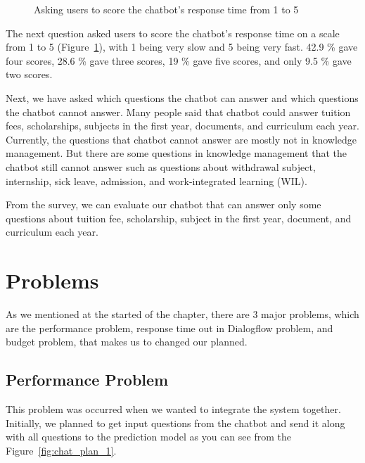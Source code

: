 \documentclass[12pt,oneside,openright,a4paper]{cpe-english-project}
\begin{document}
\begin{figure}[!h]\centering
	\caption{Asking users to score the chatbot's response time from 1 to 5}
	\label{fig:chatbot_speed}
\end{figure}

The next question asked users to score the chatbot's response time on a scale from 1 to 5 (Figure~\ref*{fig:chatbot_speed}), with 1 being very slow and 5 being very fast. 42.9 \% gave four scores, 28.6 \% gave three scores, 19 \% gave five scores, and only 9.5 \% gave two scores.

Next, we have asked which questions the chatbot can answer and which questions the chatbot cannot answer. Many people said that chatbot could answer tuition fees, scholarships, subjects in the first year, documents, and curriculum each year. Currently, the questions that chatbot cannot answer are mostly not in knowledge management. But there are some questions in knowledge management that the chatbot still cannot answer such as questions about withdrawal subject, internship, sick leave, admission, and work-integrated learning (WIL).

From the survey, we can evaluate our chatbot that can answer only some questions about tuition fee, scholarship, subject in the first year, document, and curriculum each year.

\section{Problems}
\label{ch4_problem}
As we mentioned at the started of the chapter, there are 3 major problems, which are the performance problem, response time out in Dialogflow problem, and budget problem, that makes us to changed our planned.

\subsection{Performance Problem}
This problem was occurred when we wanted to integrate the system together. Initially, we planned to get input questions from the chatbot and send it along with all questions to the prediction model as you can see from the Figure~\ref*{fig:chat_plan_1}.
\end{document}
